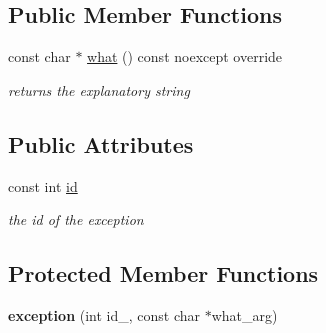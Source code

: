 \subsection*{Public Member Functions}
\begin{DoxyCompactItemize}
\item 
\mbox{\label{classnlohmann_1_1detail_1_1exception_a0672c25ecdf14d1a071d4d6478a65af0}} 
const char $\ast$ \hyperlink{classnlohmann_1_1detail_1_1exception_a0672c25ecdf14d1a071d4d6478a65af0}{what} () const noexcept override
\begin{DoxyCompactList}\small\item\em returns the explanatory string \end{DoxyCompactList}\end{DoxyCompactItemize}
\subsection*{Public Attributes}
\begin{DoxyCompactItemize}
\item 
\mbox{\label{classnlohmann_1_1detail_1_1exception_a0d4589a3fb54e81646d986c05efa3b9a}} 
const int \hyperlink{classnlohmann_1_1detail_1_1exception_a0d4589a3fb54e81646d986c05efa3b9a}{id}
\begin{DoxyCompactList}\small\item\em the id of the exception \end{DoxyCompactList}\end{DoxyCompactItemize}
\subsection*{Protected Member Functions}
\begin{DoxyCompactItemize}
\item 
\mbox{\label{classnlohmann_1_1detail_1_1exception_ae323ad0d53bc724414c2233164e65657}} 
{\bfseries exception} (int id\+\_\+, const char $\ast$what\+\_\+arg)
\end{DoxyCompactItemize}
